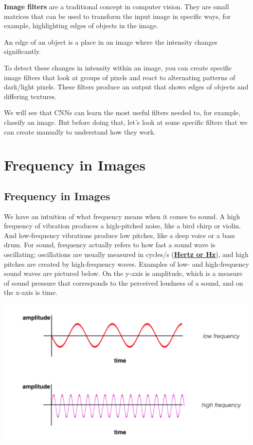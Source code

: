 \textbf{Image filters} are a traditional concept in computer vision. They are small matrices that can be used to transform the input image in specific ways, for example, highlighting edges of objects in the image. \newline

An edge of an object is a place in an image where the intensity changes significantly. \newline

To detect these changes in intensity within an image, you can create specific image filters that look at groups of pixels and react to alternating patterns of dark/light pixels. These filters produce an output that shows edges of objects and differing textures. \newline

We will see that CNNs can learn the most useful filters needed to, for example, classify an image. But before doing that, let's look at some specific filters that we can create manually to understand how they work. \newline

\section{Frequency in Images}

\subsection{Frequency in Images}

We have an intuition of what frequency means when it comes to sound. A high frequency of vibration produces a high-pitched noise, like a bird chirp or violin. And low-frequency vibrations produce low pitches, like a deep voice or a bass drum. For sound, frequency actually refers to how fast a sound wave is oscillating; oscillations are usually measured in cycles/s (\href{https://en.wikipedia.org/wiki/Hertz}{\textbf{Hertz or Hz}}), and high pitches are created by high-frequency waves. Examples of low- and high-frequency sound waves are pictured below. On the y-axis is amplitude, which is a measure of sound pressure that corresponds to the perceived loudness of a sound, and on the x-axis is time.

\includegraphics[width=0.5\linewidth]{img//cnn//concepts/screen-shot-2018-09-24-at-3.17.56-pm.png}


